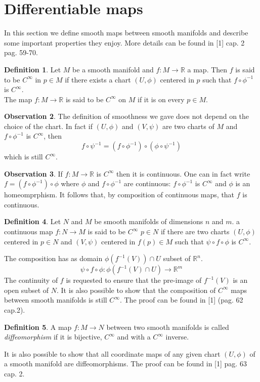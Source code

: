 \documentclass[12pt,a4paper]{report}
\theoremstyle{definition}
\newtheorem{Def}{Definition}[chapter]
\theoremstyle{Theorem}
\theoremstyle{definition}
\theoremstyle{definition}
\newtheorem{Obs}[Def]{Observation}
\begin{document}
		\section{Differentiable maps}
		In this section we define smooth maps between smooth manifolds and describe some important properties they enjoy. More details can be found in [1] cap. 2 pag. 59-70.
		\begin{Def}
			Let $M$ be a smooth manifold and $f:M\rightarrow\mathbb{R}$ a map. Then $f$ is said to be $C^\infty$ in $p\in M$ if there exists a chart $(U,\phi)$ centered in $p$ such that $f\circ \phi^{-1}$ is $C^\infty$.\\
			The map $f:M\rightarrow \mathbb{R}$ is said to be $C^\infty$ on $M$ if it is on every $p\in M$.
		\end{Def}
		\begin{Obs}
			The definition of smoothness we gave does not depend on the choice of the chart. In fact if $(U,\phi)$ and $(V,\psi)$ are two charts of $M$ and $f\circ\phi^{-1}$ is $C^\infty$, then $$f\circ\psi^{-1}=(f\circ\phi^{-1})\circ(\phi\circ\psi^{-1})$$ which is still $C^\infty$.
		\end{Obs}
		\begin{Obs}
			If $f:M\rightarrow \mathbb{R}$ is $C^\infty$ then it is continuous. One can in fact write $f=(f\circ\phi^{-1})\circ \phi$ where $\phi$ and $f\circ\phi^{-1}$ are continuous: $f\circ\phi^{-1}$ is $C^\infty$ and $\phi$ is an homeomprphism. It follows that, by composition of continuous maps, that $f$ is continuous.\\
		\end{Obs}
		\begin{Def}
			Let $N$ and $M$ be smooth manifolds of dimensions $n$ and $m$. a continuous map $f:N\rightarrow M$ is said to be $C^\infty$  $p\in N$ if there are two charts $(U,\phi)$ centered in $p\in N$ and $(V,\psi)$ centered in $f(p)\in M$ such that $\psi\circ f\circ \phi$ is $C^\infty$.
		\end{Def}
		The composition has as domain $\phi(f^{-1}(V))\cap U$ subset of $\mathbb{R}^n$. $$\psi\circ f\circ \phi:\phi(f^{-1}(V)\cap U)\rightarrow \mathbb{R}^m$$
		The continuity of $f$ is requested to ensure that the pre-image of $f^{-1}(V)$ is an open subset of $N$. It is also possible to show that the composition of $C^\infty$ maps between smooth manifolds is still $C^\infty$. The proof can be found in [1] (pag. 62 cap.2). 
		\begin{Def}
			A map $f:M\rightarrow N$ between two smooth manifolds is called \textit{diffeomorphism} if it is bijective, $C^\infty$ and with a $C^\infty$ inverse.
		\end{Def}
		It is also possible to show that all coordinate maps of any given chart $(U,\phi)$ of a smooth manifold are diffeomorphisms. The proof can be found in [1] pag. 63 cap. 2.
\end{document}

